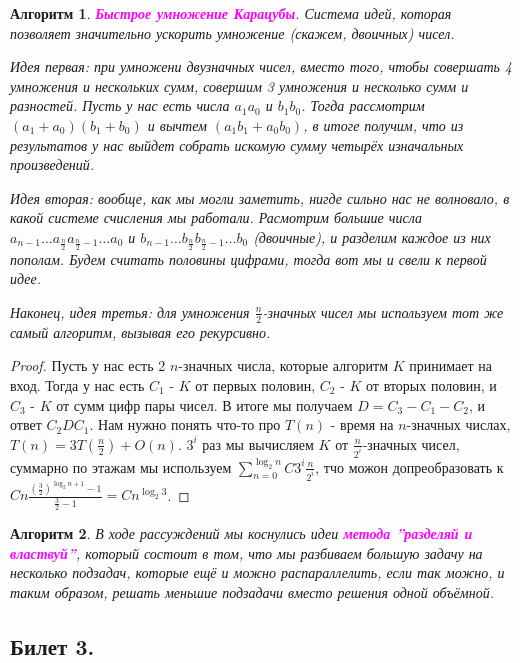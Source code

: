 \documentclass[a4paper]{article}
\theoremstyle{indented}
\newtheorem{alg}{Алгоритм}
\theoremstyle{definition}
\theoremstyle{remark}
\begin{document}
\begin{alg}
    \textcolor{magenta}{\hypertarget{t-1}{\textbf{Быстрое умножение Карацубы}}}. Система идей, которая позволяет значительно ускорить умножение (скажем, двоичных) чисел. \ 

    Идея первая: при умножени двузначных чисел, вместо того, чтобы совершать 4 умножения и нескольких сумм, совершим 3 умножения и несколько сумм и разностей. Пусть у нас есть числа $a_1a_0$ и $b_1b_0$. Тогда рассмотрим $(a_1+a_0)(b_1+b_0)$ и вычтем $(a_1b_1+a_0b_0)$, в итоге получим, что из результатов у нас выйдет собрать искомую сумму четырёх изначальных произведений. \ 
     
    Идея вторая: вообще, как мы могли заметить, нигде сильно нас не волновало, в какой системе счисления мы работали. Расмотрим большие числа $a_{n-1}\ldots a_{\frac{n}{2}}a_{\frac{n}{2}-1}\ldots a_0$ и $b_{n-1}\ldots b_{\frac{n}{2}}b_{\frac{n}{2}-1}\ldots b_0$ (двоичные), и разделим каждое из них пополам. Будем считать половины цифрами, тогда вот мы и свели к первой идее. \ 

    Наконец, идея третья: для умножения $\frac{n}{2}$-значных чисел мы используем тот же самый алгоритм, вызывая его рекурсивно. 
\end{alg}

\begin{proof}
    Пусть у нас есть 2 $n$-значных числа, которые алгоритм $K$ принимает на вход. Тогда у нас есть $C_1$ - $K$ от первых половин, $C_2$ - $K$ от вторых половин, и $C_3$ - $K$ от сумм цифр пары чисел. В итоге мы получаем $D=C_3-C_1-C_2$, и ответ $C_2 D C_1$. Нам нужно понять что-то про $T(n)$ - время на $n$-значных числах, $T(n)=3T(\frac{n}{2})+O(n)$. $3^i$ раз мы вычисляем $K$ от $\frac{n}{2^i}$-значных чисел, суммарно по этажам мы используем $\sum_{n=0}^{\log_2 n}C 3^i \frac{n}{2^i}$, тчо можон допреобразовать к $Cn\frac{(\frac{3}{2})^{\log_2 n+1}-1}{\frac{3}{2}-1}=Cn^{\log_2 3}$.
\end{proof}

\begin{alg}
    В ходе рассуждений мы коснулись идеи \textcolor{magenta}{\hypertarget{t-2}{\textbf{метода ''разделяй и властвуй''}}}, который состоит в том, что мы разбиваем большую задачу на несколько подзадач, которые ещё и можно распараллелить, если так можно, и таким образом, решать меньшие подзадачи вместо решения одной объёмной.
\end{alg}

\subsection{Билет 3.}
\end{document}
